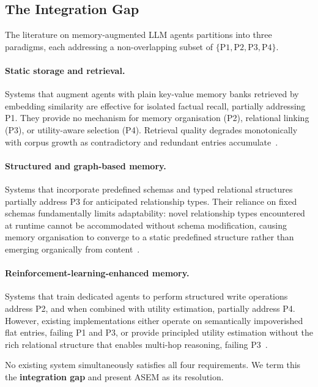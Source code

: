 \documentclass{article}
\newcommand{\ours}{\textsc{ASEM}\xspace}
\begin{document}
\subsection{The Integration Gap}
\label{subsec:gap}

The literature on memory-augmented LLM agents partitions into three paradigms,
each addressing a non-overlapping subset of $\{\text{P1}, \text{P2}, \text{P3},
\text{P4}\}$.

\paragraph{Static storage and retrieval.}
Systems that augment agents with plain key-value memory banks retrieved by
embedding similarity are effective for isolated factual recall, partially
addressing P1.
They provide no mechanism for memory organisation (P2), relational linking
(P3), or utility-aware selection (P4).
Retrieval quality degrades monotonically with corpus growth as contradictory
and redundant entries accumulate~\cite{packer2023memgpt, zhong2024memorybank}.

\paragraph{Structured and graph-based memory.}
Systems that incorporate predefined schemas and typed relational structures
partially address P3 for anticipated relationship types.
Their reliance on fixed schemas fundamentally limits adaptability: novel
relationship types encountered at runtime cannot be accommodated without
schema modification, causing memory organisation to converge to a static
predefined structure rather than emerging organically from
content~\cite{chhikara2025mem0}.

\paragraph{Reinforcement-learning-enhanced memory.}
Systems that train dedicated agents to perform structured write operations
address P2, and when combined with utility estimation, partially address P4.
However, existing implementations either operate on semantically impoverished
flat entries, failing P1 and P3, or provide principled utility estimation
without the rich relational structure that enables multi-hop reasoning,
failing P3~\cite{memoryr12025, memrl2026}.

No existing system simultaneously satisfies all four requirements.
We term this the \textbf{integration gap} and present \ours as its resolution.
\end{document}

